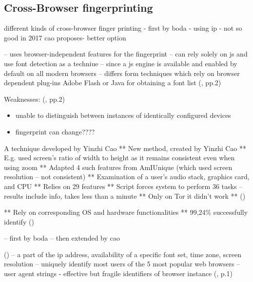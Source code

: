\subsection{Cross-Browser fingerprinting}

different kinds of cross-browser finger printing - first by boda - using ip - not so good
in 2017 cao proposes- better option

-- uses browser-independent features for the fingerprint
-- can rely solely on js and use font detection as a techniue
-- since a js engine is available and enabled by default on all modern browsers 
-- differs form techniques which rely on browser dependent plug-ins Adobe Flash or Java for obtaining a font list
(\textcite{upi15}, pp.2)
 
Weaknesses: (\textcite{upi15}, pp.2)
\begin{itemize}
	\item unable to distinguish between instances of identically configured devices
	\item fingerprint can change????
\end{itemize} 
 

A technique developed by Yinzhi Cao
**	New method, created by Yinzhi Cao
**	E.g. used screen’s ratio of width to height as it remains consistent even when using zoom
**	Adapted 4 such features from AmIUnique (which used screen resolution – not consistent)
**	Examination of a user’s audio stack, graphics card, and CPU
**	Relies on 29 features
**	Script forces system to perform 36 tasks – results include info, takes less than a minute
**	Only on Tor it didn’t work
**	(\textcite{nordrum17})

**	Rely on corresponding OS and hardware functionalities
**	99,24\%  successfully identify (\textcite{Cao17})

-- first by boda
-- then extended by cao


(\textcite{boda11})
-- a part of the ip address, availability of a specific font set, time zone, screen resolution
-- uniquely identify most users of the 5 most popular web browsers
-- user agent strings - effective but fragile identifiers of browser instance
(\textcite{boda11}, p.1)


